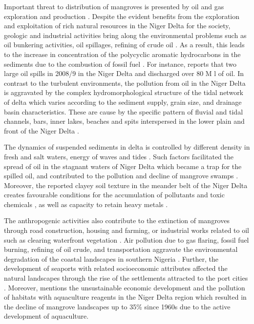 \documentclass[jmse,article,submit,pdftex,moreauthors]{Definitions/mdpi}
\begin{document}
Important threat to distribution of mangroves is presented by oil and gas exploration and production \cite{su142114256}. Despite the evident benefits from the exploration and exploitation of rich natural resources in the Niger Delta for the society, geologic and industrial activities  bring along the environmental problems such as oil bunkering activities, oil spillages, refining of crude oil \cite{EYANKWARE2020100293}. As a result, this leads to the increase in concentration of the polycyclic aromatic hydrocarbons in the sediments due to the combustion of fossil fuel \cite{Sojinu}. For instance, \cite{OBIDA2021145854} reports that two large oil spills in 2008/9 in the Niger Delta and discharged over 80 M l of oil. In contrast to the turbulent environments, the pollution from oil in the Niger Delta is aggravated by the complex hydromorphological structure of the tidal network of delta which varies according to the sediment supply, grain size, and drainage basin characteristics. These are cause by the specific pattern of fluvial and tidal channels, bars, inner lakes, beaches and spits interspersed in the lower plain and front of the Niger Delta \cite{GEORGE2019103592}. 

The dynamics of suspended sediments in delta is controlled by different density in fresh and salt waters, energy of waves and tides \cite{Munasinghe}. Such factors facilitated the spread of oil in the stagnant waters of Niger Delta which became a trap for the spilled oil, and contributed to the pollution and decline of mangrove swamps \cite{ONYIA2020377,ODISU2021111993,ZABBEY2014167}. Moreover, the reported clayey soil texture in the meander belt of the Niger Delta \cite{Kamalu} creates favourable conditions for the accumulation of pollutants and toxic chemicals \cite{w13223295,toxics11010006,UKHUREBOR2021112872}, as well as capacity to retain heavy metals \cite{Amusan,OKOYE2022100222,OKOYE2021111273}.

The anthropogenic activities also contribute to the extinction of mangroves through road construction, housing and farming, or industrial works related to oil such as clearing waterfront vegetation \cite{Zabbey}. Air pollution due to gas flaring, fossil fuel burning, refining of oil crude, and transportation aggravate the environmental degradation of the coastal landscapes in southern Nigeria \cite{socsci11110525}. Further, the development of seaports with related socioeconomic attributes affected the natural landscapes through the rise of the settlements attracted to the port cities \cite{OMIUNU198957}. Moreover, \cite{Godstime} mentions the unsustainable economic development and the pollution of habitats with aquaculture reagents in the Niger Delta region which resulted in the decline of mangrove landscapes up to 35\% since 1960s due to the active development of aquaculture. 
\end{document}
